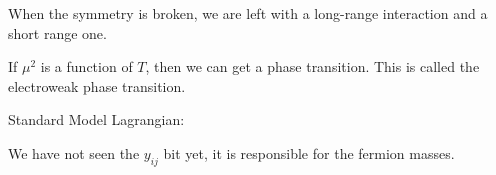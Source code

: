 \documentclass[main.tex]{subfiles}
\begin{document}
When the symmetry is broken, we are left with a long-range interaction and a short range one.

If \(\mu^2\) is a function of \(T\), then we can get a phase transition.
This is called the electroweak phase transition.

Standard Model Lagrangian: 
%

We have not seen the \(y_{ij}\) bit yet, it is responsible for the fermion masses.
\end{document}

